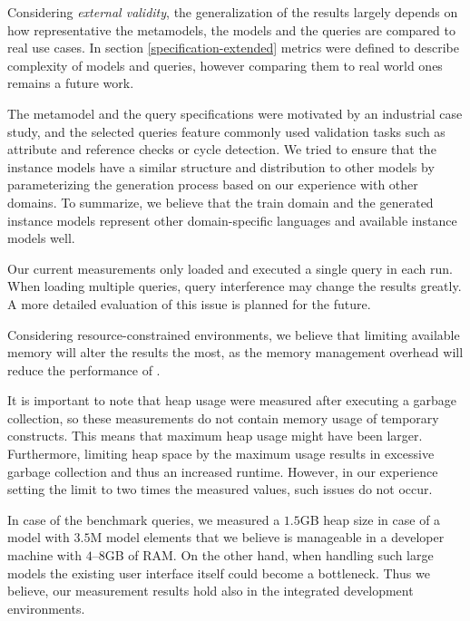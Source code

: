 Considering \emph{external validity}, the generalization of the results largely
depends on how representative the metamodels, the models and the queries are
compared to real use cases. In section \ref{specification-extended} metrics were
defined to describe complexity of models and queries, however comparing them to
real world ones remains a future work.

The metamodel and the query specifications were motivated by an industrial case
study, and the selected queries feature commonly used validation tasks such as
attribute and reference checks or cycle detection. We tried to ensure that the
instance models have a similar structure and distribution to other models by
parameterizing the generation process based on our experience with other
domains. To summarize, we believe that the train domain and the generated
instance models represent other domain-specific languages and available instance
models well.

Our current measurements only loaded and executed a single query in each run.
When loading multiple queries, query interference may change the results
greatly. A more detailed evaluation of this issue is planned for the future.

Considering resource-constrained environments, we believe that limiting
available memory will alter the results the most, as the memory management
overhead will reduce the performance of \incquery{}.

It is important to note that heap usage were measured after executing a garbage
collection, so these measurements do not contain memory usage of temporary
constructs. This means that maximum heap usage might have been larger. Furthermore,
limiting heap space by the maximum usage results in excessive garbage collection
and thus an increased runtime. However, in our experience setting the limit to
two times the measured values, such issues do not occur.

In case of the benchmark queries, we measured a $1.5$GB heap size in case of a
model with $3.5$M model elements that we believe is manageable in a developer
machine with $4$--$8$GB of RAM. On the other hand, when handling such large
models the existing user interface itself could become a bottleneck. Thus we
believe, our measurement results hold also in the integrated development
environments.
